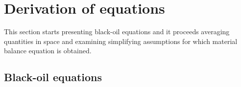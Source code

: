 \documentclass[final,authoryear,5p,times,twocolumn,10pt]{elsarticle}
\begin{document}
%
%
%
%
%
%
%
%

\section{Derivation of equations}

This section starts presenting black-oil equations and it proceeds averaging quantities in space and examining simplifying assumptions for which material balance equation is obtained.

\subsection{Black-oil equations}
\end{document}
